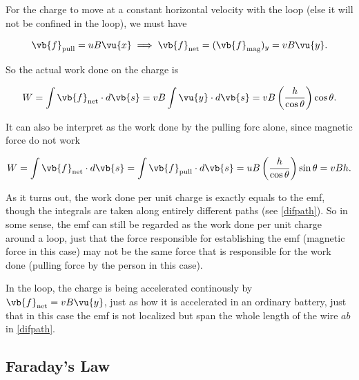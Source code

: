 \documentclass[english,a4paper,12pt]{report}
\begin{document}


For the charge to move at a constant horizontal velocity with the loop (else it will not be confined in the loop), we must have 

\begin{equation}
    \vb{f} _{\text{pull} } = uB \vu{x} \implies \vb{f} _{\text{net} } = (\vb{f} _{\text{mag} })_{y} = vB \vu{y} . 
\end{equation}

So the actual work done on the charge is 

\begin{equation}
    W = \int \vb{f} _{\text{net} } \cdot d \vb{s} = vB \int \vu{y} \cdot d \vb{s} = vB\left( \frac{h}{\cos \theta }  \right)\cos \theta .
\end{equation}

It can also be interpret as the work done by the pulling forc alone, since magnetic force do not work

\begin{equation}
    W = \int \vb{f} _{\text{net} } \cdot d \vb{s} =  \int \vb{f} _{\text{pull} } \cdot  d \vb{s} =  uB \left( \frac{h}{\cos \theta }   \right) \sin \theta  = vBh.
\end{equation}

As it turns out, the work done per unit charge is exactly equals to the emf, though the integrals are taken along entirely different paths (see \cref{difpath}). So in some sense, the emf can still be regarded as the work done per unit charge around a loop, just that the force responsible for establishing the emf (magnetic force in this case) may not be the same force that is responsible for the work done (pulling force by the person in this case).

In the loop, the charge is being accelerated continously by \(\vb{f} _{\text{net} } = vB \vu{y}  \), just as how it is accelerated in an ordinary battery, just that in this case the emf is not localized but span the whole length of the wire \(ab\) in \cref{difpath}.    

\subsection{Faraday's Law}
\end{document}
